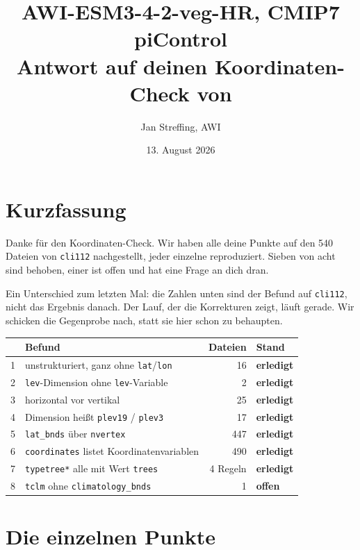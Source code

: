 \documentclass[11pt,a4paper]{article}
\title{AWI-ESM3-4-2-veg-HR, CMIP7 piControl\\[2mm]
\large Antwort auf deinen Koordinaten-Check von \code{cli112}}
\author{Jan Streffing, AWI}
\date{13. August 2026}
\newcommand{\code}[1]{\texttt{\small #1}}
\newcommand{\ok}{\textcolor{green!45!black}{\textbf{erledigt}}}
\newcommand{\offen}{\textcolor{orange!75!black}{\textbf{offen}}}
\begin{document}
\maketitle

\section{Kurzfassung}

Danke f\"ur den Koordinaten-Check. Wir haben alle deine Punkte auf den 540 Dateien
von \code{cli112} nachgestellt, jeder einzelne reproduziert. Sieben von acht sind
behoben, einer ist offen und hat eine Frage an dich dran.

Ein Unterschied zum letzten Mal: die Zahlen unten sind der Befund auf
\code{cli112}, nicht das Ergebnis danach. Der Lauf, der die Korrekturen zeigt,
l\"auft gerade. Wir schicken die Gegenprobe nach, statt sie hier schon zu
behaupten.

\begin{center}
\begin{tabular}{llr l}
\toprule
& \textbf{Befund} & \textbf{Dateien} & \textbf{Stand} \\
\midrule
1 & unstrukturiert, ganz ohne \code{lat}/\code{lon}      & 16  & \ok \\
2 & \code{lev}-Dimension ohne \code{lev}-Variable        & 2   & \ok \\
3 & horizontal vor vertikal                              & 25  & \ok \\
4 & Dimension hei\ss t \code{plev19} / \code{plev3}      & 17  & \ok \\
5 & \code{lat\_bnds} \"uber \code{nvertex}               & 447 & \ok \\
6 & \code{coordinates} listet Koordinatenvariablen       & 490 & \ok \\
7 & \code{typetree*} alle mit Wert \code{trees}          & 4 Regeln & \ok \\
8 & \code{tclm} ohne \code{climatology\_bnds}            & 1   & \offen \\
\bottomrule
\end{tabular}
\end{center}

\section{Die einzelnen Punkte}
\end{document}
